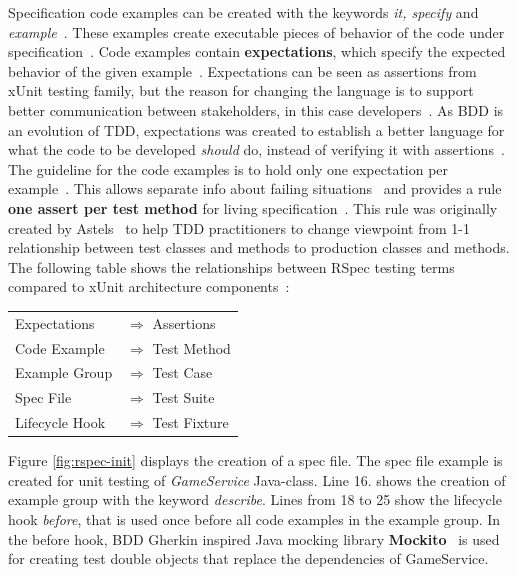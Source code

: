     Specification code examples can be created with the keywords \textit{it, specify} and \textit{example}~\cite{rspec-core}.
    These examples create executable pieces of behavior of the code under specification~\cite{chelimsky2010rspec}. Code examples
    contain \textbf{expectations}, which specify the expected behavior of the given example~\cite{chelimsky2010rspec}. Expectations can
    be seen as assertions from xUnit testing family, but the reason for changing the language is to support better communication
    between stakeholders, in this case developers~\cite{chelimsky2010rspec}. As BDD is an evolution of TDD, expectations
    was created to establish a better language for what the code to be developed \textit{should} do, instead of verifying it
    with assertions~\cite{astels2006new}. The guideline for the code examples is to hold only one expectation per example~\cite{chelimsky2010rspec}.
    This allows separate info about failing situations~\cite{chelimsky2010rspec} and provides a rule \textbf{one assert per test method}
    for living specification~\cite{astels2006new}. This rule was originally created by Astels~\cite{astels2006new} to
    help TDD practitioners to change viewpoint from 1-1 relationship between test classes and methods to production classes
    and methods.
    The following table shows the relationships between RSpec testing terms compared to xUnit architecture components~\cite{chelimsky2010rspec}:

    \begin{longtable}{@{}p{}p{}@{}}
    Expectations & $\Longrightarrow$  \textrm{Assertions} \\
    Code Example & $\Longrightarrow$  \textrm{Test Method} \\
    Example Group & $\Longrightarrow$  \textrm{Test Case} \\
    Spec File & $\Longrightarrow$  \textrm{Test Suite} \\
    Lifecycle Hook & $\Longrightarrow$  \textrm{Test Fixture} \\
    \end{longtable}

    Figure \ref{fig:rspec-init} displays the creation of a spec file. The spec file example is created for unit testing
    of \textit{GameService} Java-class. Line 16. shows the creation of example group with the keyword \textit{describe}. Lines from
    18 to 25 show the lifecycle hook \textit{before}, that is used once before all code examples in the example group.
    In the before hook, BDD Gherkin inspired Java mocking library \textbf{Mockito}~\cite{mockito} is used for
    creating test double objects that replace the dependencies of GameService.


